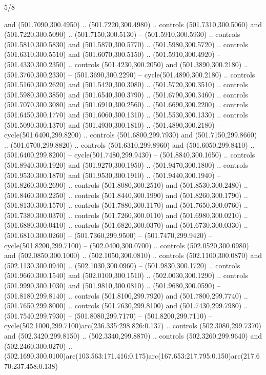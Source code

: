 \begin{flagdescription}{5/8}
\begin{scope}[xshift=0.5\flaglength,yshift=0.5\flagwidth,scale=\flagwidth/475.63]
\begin{scope}[y=0.8pt, x=0.8pt, yscale=-1, xscale=1,shift={(-450,-300)}]
\begin{scope}[cm={{1.0,0.0,0.0,1.0,(-0.0002,0.12556)}},cm={{1.0,0.0,0.0,1.0,(0.00179,0.0)}}]
\begin{scope}[cm={{1.11592,0.0,0.0,1.11592,(-106.89933,-41.77764)}}]
\begin{scope}[draw=black,fill=cfff]
\begin{scope}[fill=black]
  and (501.7090,300.4950) .. (501.7220,300.4980) .. controls (501.7310,300.5060)
  and (501.7220,300.5090) .. (501.7150,300.5130) -- (501.5910,300.5930) ..
  controls (501.5810,300.5830) and (501.5870,300.5770) .. (501.5980,300.5720) ..
  controls (501.6310,300.5510) and (501.6070,300.5150) .. (501.5910,300.4920) --
  (501.4330,300.2350) .. controls (501.4230,300.2050) and (501.3890,300.2180) ..
  (501.3760,300.2330) -- (501.3690,300.2290) -- cycle(501.4890,300.2180) ..
  controls (501.5160,300.2620) and (501.5420,300.3080) .. (501.5720,300.3510) ..
  controls (501.5980,300.3850) and (501.6540,300.3790) .. (501.6790,300.3460) ..
  controls (501.7070,300.3080) and (501.6910,300.2560) .. (501.6690,300.2200) ..
  controls (501.6450,300.1770) and (501.6060,300.1310) .. (501.5530,300.1330) ..
  controls (501.5090,300.1370) and (501.4930,300.1810) .. (501.4890,300.2180) --
  cycle(501.6400,299.8200) .. controls (501.6800,299.7930) and
  (501.7150,299.8660) .. (501.6700,299.8820) .. controls (501.6310,299.8960) and
  (501.6050,299.8410) .. (501.6400,299.8200) -- cycle(501.7480,299.9430) --
  (501.8840,300.1650) .. controls (501.8940,300.1920) and (501.9270,300.1950) ..
  (501.9470,300.1800) .. controls (501.9530,300.1870) and (501.9530,300.1910) ..
  (501.9440,300.1940) -- (501.8260,300.2690) .. controls (501.8080,300.2510) and
  (501.8530,300.2480) .. (501.8460,300.2250) .. controls (501.8440,300.1990) and
  (501.8260,300.1790) .. (501.8130,300.1570) .. controls (501.7880,300.1170) and
  (501.7650,300.0760) .. (501.7380,300.0370) .. controls (501.7260,300.0110) and
  (501.6980,300.0210) .. (501.6880,300.0410) .. controls (501.6820,300.0370) and
  (501.6730,300.0330) .. (501.6810,300.0260) -- (501.7360,299.9500) --
  (501.7470,299.9420) -- cycle(501.8200,299.7100) -- (502.0400,300.0700) ..
  controls (502.0520,300.0980) and (502.0850,300.1000) .. (502.1050,300.0810) ..
  controls (502.1100,300.0870) and (502.1130,300.0940) .. (502.1030,300.0960) --
  (501.9830,300.1720) .. controls (501.9660,300.1540) and (502.0100,300.1510) ..
  (502.0030,300.1290) .. controls (501.9990,300.1030) and (501.9810,300.0810) ..
  (501.9680,300.0590) -- (501.8180,299.8140) .. controls (501.8100,299.7920) and
  (501.7800,299.7740) .. (501.7650,299.8000) .. controls (501.7630,299.8100) and
  (501.7430,299.7980) .. (501.7540,299.7930) -- (501.8080,299.7170) --
  (501.8200,299.7110) -- cycle(502.1000,299.7100)arc(236.335:298.826:0.137) ..
  controls (502.3080,299.7370) and (502.3420,299.8150) .. (502.3340,299.8870) ..
  controls (502.3260,299.9640) and (502.2460,300.0270) ..
  (502.1690,300.0100)arc(103.563:171.416:0.175)arc(167.653:217.795:0.150)arc(217.670:237.458:0.138)

\end{scope}
\end{scope}
\end{scope}
\end{scope}
\end{scope}
\end{scope}
\end{flagdescription}

